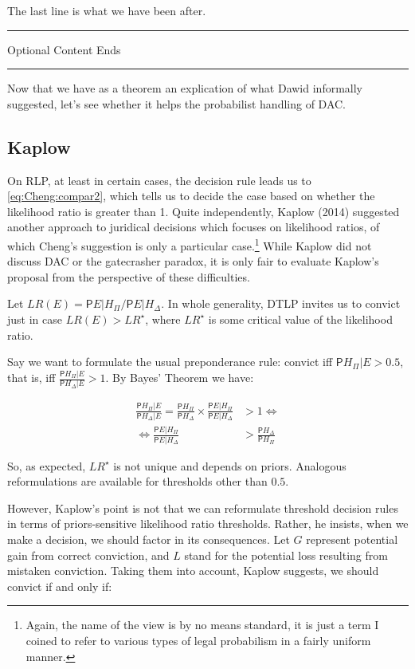 \documentclass[10pt,dvipsnames,enabledeprecatedfontcommands]{scrartcl}
\newcommand{\pr}{\mathsf{P}}
\newcommand{\intermezzob}{\nopagebreak 
	\begin{minipage}[c]{13cm}
	\begin{center}\rule{10cm}{0.4pt}

	\tiny{\sc Optional Content Ends}
	
	\vspace{-1mm}
	
	\rule{10cm}{0.4pt}\end{center}
	\end{minipage}
	}
\begin{document}
\vspace{1mm}

The last line is what we have been after.

\intermezzob

Now that we have as a theorem an explication of what Dawid informally
suggested, let's see whether it helps the probabilist handling of DAC.

\subsection{Kaplow}\label{kaplow}

On RLP, at least in certain cases, the decision rule leads us to
\eqref{eq:Cheng:compar2}, which tells us to decide the case based on
whether the likelihood ratio is greater than 1. Quite independently,
Kaplow (2014) suggested another approach to juridical decisions which
focuses on likelihood ratios, of which Cheng's suggestion is only a
particular
case.\footnote{Again, the name of the view is by no means standard, it is  just a term I coined to refer to various types of legal probabilism in a fairly uniform manner.}
While Kaplow did not discuss DAC or the gatecrasher paradox, it is only
fair to evaluate Kaplow's proposal from the perspective of these
difficulties.

Let \(LR(E)=\pr{E\vert H_\Pi}/\pr{E\vert H_\Delta}\). In whole
generality, DTLP invites us to convict just in case \(LR(E)>LR^\star\),
where \(LR^\star\) is some critical value of the likelihood ratio.

Say we want to formulate the usual preponderance rule: convict iff
\(\pr{H_\Pi\vert E}>0.5\), that is, iff
\(\frac{\pr{H_\Pi\vert E}}{\pr{H_\Delta\vert E}}>1\). By Bayes' Theorem
we have:

\begin{align*}
\frac{\pr{H_\Pi\vert E}}{\pr{H_\Delta\vert E}} =  \frac{\pr{H_\Pi}}{\pr{H_\Delta}}\times \frac{\pr{E\vert H_\Pi}}{\pr{E\vert H_\Delta}} &>1 \Leftrightarrow\\
  \Leftrightarrow \frac{\pr{E\vert H_\Pi}}{\pr{E\vert H_\Delta}} &> \frac{\pr{H_\Delta}}{\pr{H_\Pi}} 
 \end{align*}

\noindent So, as expected, \(LR^\star\) is not unique and depends on
priors. Analogous reformulations are available for thresholds other than
\(0.5\).

However, Kaplow's point is not that we can reformulate threshold
decision rules in terms of priors-sensitive likelihood ratio thresholds.
Rather, he insists, when we make a decision, we should factor in its
consequences. Let \(G\) represent potential gain from correct
conviction, and \(L\) stand for the potential loss resulting from
mistaken conviction. Taking them into account, Kaplow suggests, we
should convict if and only if:
\end{document}
